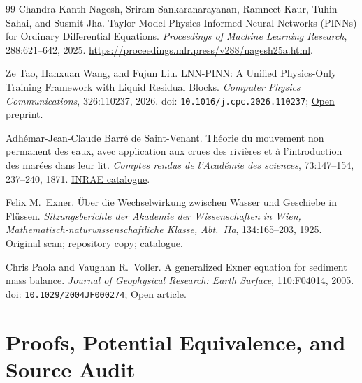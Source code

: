 \documentclass[12pt,a4paper,oneside]{report}
\numberwithin{equation}{chapter}
\theoremstyle{definition}
\theoremstyle{remark}\newtheorem{remark}[theorem]{Remark}
\begin{document}
\begin{thebibliography}{99}
Chandra Kanth Nagesh, Sriram Sankaranarayanan, Ramneet Kaur, Tuhin Sahai, and Susmit Jha. Taylor-Model Physics-Informed Neural Networks (PINNs) for Ordinary Differential Equations. \emph{Proceedings of Machine Learning Research}, 288:621--642, 2025. \url{https://proceedings.mlr.press/v288/nagesh25a.html}.

Ze Tao, Hanxuan Wang, and Fujun Liu. LNN-PINN: A Unified Physics-Only Training Framework with Liquid Residual Blocks. \emph{Computer Physics Communications}, 326:110237, 2026. doi: \nolinkurl{10.1016/j.cpc.2026.110237}; \href{https://arxiv.org/abs/2508.08935}{Open preprint}.


Adh\'emar-Jean-Claude Barr\'e de Saint-Venant. Th\'eorie du mouvement non permanent des eaux, avec application aux crues des rivi\`eres et \`a l'introduction des mar\'ees dans leur lit. \emph{Comptes rendus de l'Acad\'emie des sciences}, 73:147--154, 237--240, 1871. \href{https://belinrae.inrae.fr/index.php?id=226630\&lvl=notice_display}{INRAE catalogue}.

Felix M.\ Exner. \"Uber die Wechselwirkung zwischen Wasser und Geschiebe in Fl\"ussen. \emph{Sitzungsberichte der Akademie der Wissenschaften in Wien, Mathematisch-naturwissenschaftliche Klasse, Abt.\ IIa}, 134:165--203, 1925. \href{https://www.zobodat.at/pdf/SBAWW_134_2a_0165-0203.pdf}{Original scan}; \href{https://github.com/CarlXerophilem/Lie-ML_PDES/blob/ccfa023408e5b748d0231960aeb7f52e21075808/ref/main/Felix\%20M.\%20Exner\%20Uber\%20die\%20Wechselwirkung\%20zwischen\%20Wasser\%20und\%20Geschiebe\%20in\%20Flussen.pdf}{repository copy}; \href{https://books.google.de/books?id=7bjqZwEACAAJ}{catalogue}.

Chris Paola and Vaughan R.\ Voller. A generalized Exner equation for sediment mass balance. \emph{Journal of Geophysical Research: Earth Surface}, 110:F04014, 2005. doi: \nolinkurl{10.1029/2004JF000274}; \href{https://geoweb.uwyo.edu/geol5330/PaolaandVoller2005_JGR_GenExnerEquation.pdf}{Open article}.

\end{thebibliography}

\appendix
\chapter{Proofs, Potential Equivalence, and Source Audit}\label{app:proofs}
\end{document}

